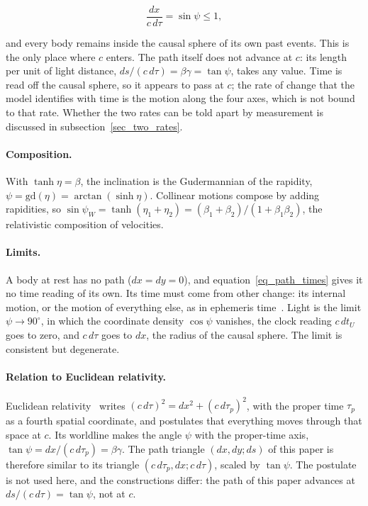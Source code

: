 \documentclass{iopjournal}
\begin{document}
\begin{equation}\label{eq_causal_sphere}
    \frac{dx}{c\,d\tau}=\sin\psi\leq1 ,
\end{equation}

and every body remains inside the causal sphere of its own past events. This is the only place where $c$ enters. The path itself does not advance at $c$: its length per unit of light distance, $ds/(c\,d\tau)=\beta\gamma=\tan\psi$, takes any value. Time is read off the causal sphere, so it appears to pass at $c$; the rate of change that the model identifies with time is the motion along the four axes, which is not bound to that rate. Whether the two rates can be told apart by measurement is discussed in subsection~\ref{sec_two_rates}.

\paragraph{Composition.} With $\tanh\eta=\beta$, the inclination is the Gudermannian of the rapidity, $\psi=\mathrm{gd}(\eta)=\arctan(\sinh\eta)$. Collinear motions compose by adding rapidities, so $\sin\psi_W=\tanh(\eta_1+\eta_2)=(\beta_1+\beta_2)/(1+\beta_1\beta_2)$, the relativistic composition of velocities.

\paragraph{Limits.} A body at rest has no path ($dx=dy=0$), and equation~\eqref{eq_path_times} gives it no time reading of its own. Its time must come from other change: its internal motion, or the motion of everything else, as in ephemeris time~\cite{Barbour2009}. Light is the limit $\psi\to90^\circ$, in which the coordinate density $\cos\psi$ vanishes, the clock reading $c\,dt_U$ goes to zero, and $c\,d\tau$ goes to $dx$, the radius of the causal sphere. The limit is consistent but degenerate.

\paragraph{Relation to Euclidean relativity.} Euclidean relativity~\cite{Montanus2001,Almeida2001} writes $(c\,d\tau)^2=dx^2+(c\,d\tau_p)^2$, with the proper time $\tau_p$ as a fourth spatial coordinate, and postulates that everything moves through that space at $c$. Its worldline makes the angle $\psi$ with the proper-time axis, $\tan\psi=dx/(c\,d\tau_p)=\beta\gamma$. The path triangle $(dx,dy;ds)$ of this paper is therefore similar to its triangle $(c\,d\tau_p,dx;c\,d\tau)$, scaled by $\tan\psi$. The postulate is not used here, and the constructions differ: the path of this paper advances at $ds/(c\,d\tau)=\tan\psi$, not at $c$.
\end{document}
